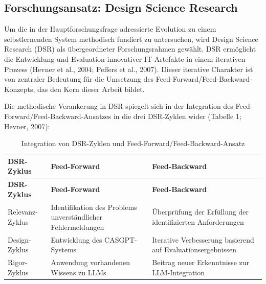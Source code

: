 \documentclass[
  a4paper,
  12pt,
  oneside,
  open=any,
  BCOR=12mm,
  DIV=14,
  parskip=half*,
  headsepline,
  footsepline,
  pointlessnumbers,
  liststotoc,
  numbers=noenddot,
  listof=totoc]{scrartcl}
\begin{document}
\subsection{Forschungsansatz: Design Science
Research}\label{forschungsansatz-design-science-research}

Um die in der Hauptforschungsfrage adressierte Evolution zu einem
selbstlernenden System methodisch fundiert zu untersuchen, wird Design
Science Research (DSR) als übergeordneter Forschungsrahmen gewählt. DSR
ermöglicht die Entwicklung und Evaluation innovativer IT-Artefakte in
einem iterativen Prozess (Hevner et al., 2004; Peffers et al., 2007).
Dieser iterative Charakter ist von zentraler Bedeutung für die Umsetzung
des Feed-Forward/Feed-Backward-Konzepts, das den Kern dieser Arbeit
bildet.

Die methodische Verankerung in DSR spiegelt sich in der Integration des
Feed-Forward/Feed-Backward-Ansatzes in die drei DSR-Zyklen wider
(Tabelle 1; Hevner, 2007):

\begin{longtable}[]{@{}
  >{\raggedright\arraybackslash}p{}
  >{\raggedright\arraybackslash}p{}
  >{\raggedright\arraybackslash}p{}@{}}
\caption{Integration von DSR-Zyklen und
Feed-Forward/Feed-Backward-Ansatz}\tabularnewline
\toprule\noalign{}
\begin{minipage}[b]{\linewidth}\raggedright
\textbf{DSR-Zyklus}
\end{minipage} & \begin{minipage}[b]{\linewidth}\raggedright
\textbf{Feed-Forward}
\end{minipage} & \begin{minipage}[b]{\linewidth}\raggedright
\textbf{Feed-Backward}
\end{minipage} \\
\midrule\noalign{}
\endfirsthead
\toprule\noalign{}
\begin{minipage}[b]{\linewidth}\raggedright
\textbf{DSR-Zyklus}
\end{minipage} & \begin{minipage}[b]{\linewidth}\raggedright
\textbf{Feed-Forward}
\end{minipage} & \begin{minipage}[b]{\linewidth}\raggedright
\textbf{Feed-Backward}
\end{minipage} \\
\midrule\noalign{}
\endhead
\bottomrule\noalign{}
\endlastfoot
Relevanz-Zyklus & Identifikation des Problems unverständlicher
Fehlermeldungen & Überprüfung der Erfüllung der identifizierten
Anforderungen \\
Design-Zyklus & Entwicklung des CASGPT-Systems & Iterative Verbesserung
basierend auf Evaluationsergebnissen \\
Rigor-Zyklus & Anwendung vorhandenen Wissens zu LLMs & Beitrag neuer
Erkenntnisse zur LLM-Integration \\
\end{longtable}
\end{document}

